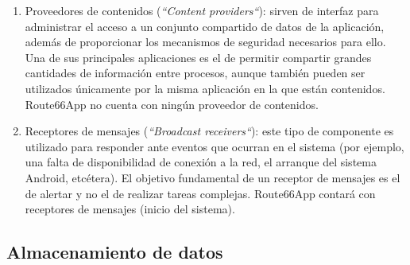 \documentclass[twoside]{report}
\begin{document}
\begin{enumerate}
\item Proveedores de contenidos (\textit{“Content providers“}): sirven de interfaz para administrar el acceso a un conjunto compartido de datos de la aplicación, además de proporcionar los mecanismos de seguridad necesarios para ello. Una de sus principales aplicaciones es el de permitir compartir grandes cantidades de información entre procesos, aunque también pueden ser utilizados únicamente por la misma aplicación en la que están contenidos.\\
Route66App no cuenta con ningún proveedor de contenidos.

\item Receptores de mensajes (\textit{“Broadcast receivers“}): este tipo de componente es utilizado para responder ante eventos que ocurran en el sistema (por ejemplo, una falta de disponibilidad de conexión a la red, el arranque del sistema Android, etcétera). El objetivo fundamental de un receptor de mensajes es el de alertar y no el de realizar tareas complejas.
Route66App contará con receptores de mensajes (inicio del sistema).
\end{enumerate}

\subsection{Almacenamiento de datos}
\end{document}
